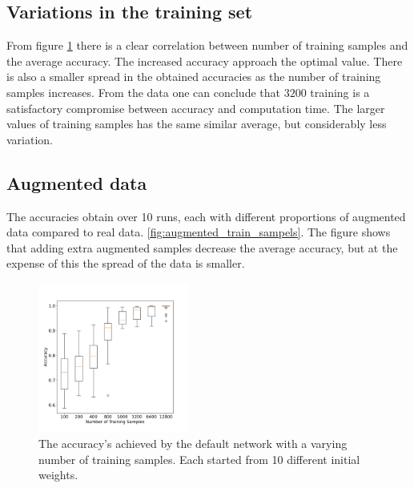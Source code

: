 \documentclass[prl,twocolumn]{revtex4-1}
\begin{document}
\subsection{Variations in the training set}

From figure \ref{fig:num_train_samples} there is a clear correlation between number of training samples and the average accuracy. The increased accuracy approach the optimal value. There is also a smaller spread in the obtained accuracies as the number of training samples increases. From the data one can conclude that $3200$ training is a satisfactory compromise between accuracy and computation time. The larger values of training samples has the same similar average, but considerably less variation. 


\subsection{Augmented data}
The accuracies obtain over 10 runs, each with different proportions of augmented data compared to real data. \ref{fig:augmented_train_sampels}. The figure shows that adding extra augmented samples decrease the average accuracy, but at the expense of this the spread of the data is smaller.


\begin{figure}[ht]
  \includegraphics[width=0.44\textwidth]{task_1/figures/num_train_box_30.pdf}
  \caption{The accuracy's achieved by the default network with a varying number of training samples. Each started from 10 different initial weights.}
  \label{fig:num_train_samples}
\end{figure}
\end{document}
